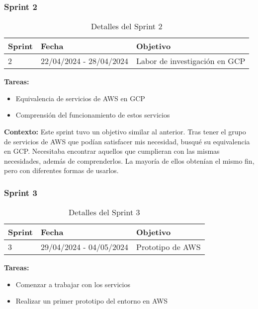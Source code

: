 \subsubsection{Sprint 2}

\begin{table}[h]
	\centering
	\begin{tabularx}
		{\textwidth}{l X X} \toprule \textbf{Sprint} & \textbf{Fecha} & \textbf{Objetivo}
		\\ \midrule 2 & 22/04/2024 - 28/04/2024 & Labor de investigación en GCP \\ \bottomrule
	\end{tabularx}
	\caption{Detalles del Sprint 2}
	\label{tab:sprint2}
\end{table}

\textbf{Tareas:}
\begin{itemize}
	\item Equivalencia de servicios de AWS en GCP

	\item Comprensión del funcionamiento de estos servicios
\end{itemize}

\textbf{Contexto:} Este sprint tuvo un objetivo similar al anterior. Tras tener el
grupo de servicios de AWS que podían satisfacer mis necesidad, busqué su
equivalencia en GCP. Necesitaba encontrar aquellos que cumplieran con las mismas
necesidades, además de comprenderlos. La mayoría de ellos obtenían el mismo fin,
pero con diferentes formas de usarlos.

\subsubsection{Sprint 3}

\begin{table}[h]
	\centering
	\begin{tabularx}
		{\textwidth}{l X X} \toprule \textbf{Sprint} & \textbf{Fecha} & \textbf{Objetivo}
		\\ \midrule 3 & 29/04/2024 - 04/05/2024 & Prototipo de AWS \\ \bottomrule
	\end{tabularx}
	\caption{Detalles del Sprint 3}
	\label{tab:sprint3}
\end{table}

\textbf{Tareas:}
\begin{itemize}
	\item Comenzar a trabajar con los servicios

	\item Realizar un primer prototipo del entorno en AWS
\end{itemize}

